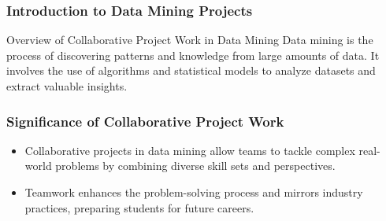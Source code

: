 \documentclass[aspectratio=169]{beamer}
\begin{document}
\frame{\titlepage}

\begin{frame}[fragile]
    \frametitle{Introduction to Data Mining Projects}
    \begin{block}{Overview of Collaborative Project Work in Data Mining}
        Data mining is the process of discovering patterns and knowledge from large amounts of data. It involves the use of algorithms and statistical models to analyze datasets and extract valuable insights.
    \end{block}
\end{frame}

\begin{frame}[fragile]
    \frametitle{Significance of Collaborative Project Work}
    \begin{itemize}
        \item Collaborative projects in data mining allow teams to tackle complex real-world problems by combining diverse skill sets and perspectives.
        \item Teamwork enhances the problem-solving process and mirrors industry practices, preparing students for future careers.
    \end{itemize}
\end{frame}
\end{document}

